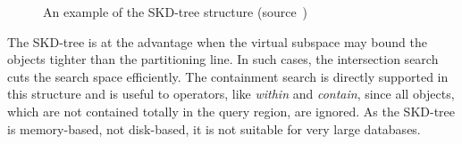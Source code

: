 \documentclass[a4paper,12pt]{article}
\begin{document}
\begin{figure}
\centering
{}
\centering
{}
\caption{An example of the SKD-tree structure (source~\cite{survey})}
\label{figskdtree}
\end{figure}
The SKD-tree is at the advantage when the virtual subspace may bound the objects tighter than the partitioning line. In such cases, the intersection search cuts the search space efficiently. The containment search is directly supported in this structure and is useful to operators, like \textit{within} and \textit{contain}, since all objects, which are not contained totally in the query region, are ignored.
As the SKD-tree is memory-based, not disk-based, it is not suitable for very large databases.


 
\end{document}

